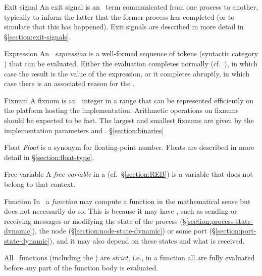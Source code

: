 \begin{Lentry}
\item[Exit signal]
An exit signal is an \Erlang\ term communicated from one process to
another, typically to inform the latter that the former process has
completed (or to simulate that this has happened). Exit signals are
described in more detail in
\S\ref{section:exit-signals}.

\item[Expression]
An \Erlang\ \emph{expression} is a well-formed sequence of tokens
(syntactic category ) that can be evaluated.  Either the
evaluation completes normally (cf.\ ), in which
case the result is the value of the expression, or it completes
abruptly, in which case there is an associated reason for the
.

\item[Fixnum]
A fixnum is an \Erlang\ integer in a range that can be represented
efficiently on the platform hosting the implementation.  Arithmetic
operations on fixnums should be expected to be fast.  The largest and
smallest fixnums are given by the implementation parameters
 and .
\S\ref{section:binaries}

\item[Float]
\emph{Float} is a synonym for floating-point number.
Floats are described in more detail in \S\ref{section:float-type}.

\item[Free variable]
A \emph{free variable} in a  (cf.~\S\ref{section:REB})
is a variable that does not belong to that context.

\item[Function]
In \Erlang\ a \emph{function} may compute a function in the
mathematical sense but does not necessarily do so.  This is because it
may have , such as sending or receiving messages or
modifying the state of the process
(\S\ref{section:process-state-dynamic}), the node
(\S\ref{section:node-state-dynamic}) or some port
(\S\ref{section:port-state-dynamic}), and it may also depend on these
states and what is received.

All \Erlang\ functions (including the ) are
\emph{strict},
i.e., in a function  all  are fully
evaluated before any part of the function body is evaluated.


\end{Lentry}
